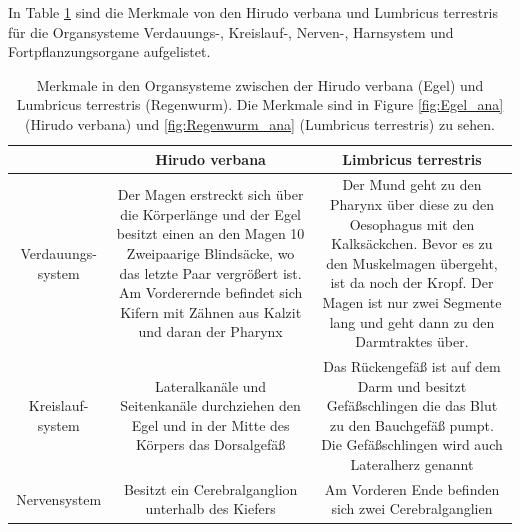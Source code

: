 \documentclass[oneside,10pt,a4paper]{report}
\begin{document}
				In Table \ref{tab: Egel vs Regenwurm} sind die Merkmale von den Hirudo verbana und Lumbricus terrestris für die Organsysteme Verdauungs-, Kreislauf-, Nerven-, Harnsystem und Fortpflanzungsorgane aufgelistet. 
				\begin{table}[H]
					\centering
					\caption{Merkmale in den Organsysteme zwischen der Hirudo verbana (Egel) und Lumbricus terrestris (Regenwurm). Die Merkmale sind in Figure \ref{fig:Egel_ana} (Hirudo verbana) und \ref{fig:Regenwurm_ana} (Lumbricus terrestris) zu sehen.}
					\label{tab: Egel vs Regenwurm}
					\begin{tabular}{c c c}
						\toprule
						& Hirudo verbana & Limbricus terrestris\\
						\midrule
						\multirow{7}{*}{\parbox[t]{2cm}{Verdauungs- system}} & \multirow{7}{*}{\parbox[t]{6cm}{Der Magen erstreckt sich über die Körperlänge und der Egel besitzt einen an den Magen 10 Zweipaarige Blindsäcke, wo das letzte Paar vergrößert ist. Am Vorderernde befindet sich Kifern mit Zähnen aus Kalzit und daran der Pharynx}}&\multirow{7}{*}{\parbox[t]{6cm}{Der Mund geht zu den Pharynx über diese zu den Oesophagus mit den Kalksäckchen. Bevor es zu den Muskelmagen übergeht, ist da noch der Kropf. Der Magen ist nur zwei Segmente lang und geht dann zu den Darmtraktes über.}}\\
						&&\\
						&&\\
						&&\\
						&&\\
						&&\\
						&&\\
						\midrule
						\multirow{5}{*}{\parbox[t]{2cm}{Kreislauf- system}}& \multirow{5}{*}{\parbox[t]{6cm}{Lateralkanäle und Seitenkanäle durchziehen den Egel und in der Mitte des Körpers das Dorsalgefäß}}&\multirow{5}{*}{\parbox[t]{6cm}{Das Rückengefäß ist auf dem Darm und besitzt Gefäßschlingen die das Blut zu den Bauchgefäß pumpt. Die Gefäßschlingen wird auch Lateralherz genannt}}\\	
						& &\\
						&&\\
						&&\\
						&&\\
						\midrule
						\multirow{2}{*}{\parbox[t]{2cm}{Nervensystem}} & \multirow{2}{*}{\parbox[t]{6cm}{Besitzt ein Cerebralganglion unterhalb des Kiefers}}&\multirow{2}{*}{\parbox[t]{6cm}{Am Vorderen Ende befinden sich zwei Cerebralganglien}}\\
						& &\\

\end{tabular}
\end{table}
\end{document}
